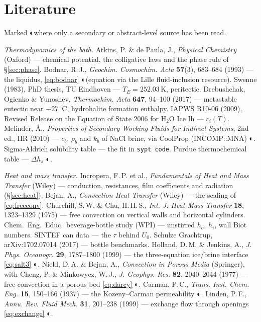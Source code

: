 \documentclass[11pt,a4paper]{article}
\newcommand{\dC}{\,^{\circ}\mathrm{C}}
\newcommand{\code}[1]{\texttt{#1}}
\newcommand{\secsrc}{{\symfont ◐}}
\begin{document}
\section{Literature}
\label{sec:lit}

Marked \secsrc where only a secondary or abstract-level source has been read.

\emph{Thermodynamics of the bath.} Atkins, P. \& de Paula, J., \emph{Physical Chemistry} (Oxford) — chemical
potential, the colligative laws and the phase rule of §\ref{sec:phase}. Bodnar, R.\,J., \emph{Geochim.
Cosmochim. Acta} \textbf{57}(3), 683–684 (1993) — the liquidus, \eqref{eq:bodnar} \secsrc (equation via the
Lille fluid-inclusion resource). Swenne (1983), PhD thesis, TU Eindhoven — $T_E = 252.03$\,K, peritectic.
Drebushchak, Ogienko \& Yunoshev, \emph{Thermochim. Acta} \textbf{647}, 94–100 (2017) — metastable eutectic
near $-27\dC$, hydrohalite formation enthalpy. IAPWS R10-06 (2009), Revised Release on the Equation of
State 2006 for H$_2$O Ice Ih — $c_i(T)$. Melinder, Å., \emph{Properties of Secondary Working Fluids for
Indirect Systems}, 2nd ed., IIR (2010) — $c_b$, $\rho_b$ and $k_b$ of NaCl brine, via CoolProp
(INCOMP::MNA) \secsrc. Sigma-Aldrich solubility table — the fit in \code{sypt code}. Purdue thermochemical
table — $\Delta h_s$ \secsrc.

\emph{Heat and mass transfer.} Incropera, F.\,P. et al., \emph{Fundamentals of Heat and Mass Transfer}
(Wiley) — conduction, resistances, film coefficients and radiation (§\ref{sec:heat}). Bejan, A.,
\emph{Convection Heat Transfer} (Wiley) — the scaling of \eqref{eq:freeconv}. Churchill, S.\,W. \& Chu,
H.\,H.\,S., \emph{Int. J. Heat Mass Transfer} \textbf{18}, 1323–1329 (1975) — free convection on vertical
walls and horizontal cylinders. Chem.\ Eng.\ Educ.\ beverage-bottle study (WPI) — unstirred $h_o$, $h_i$,
wall Biot numbers. SINTEF can data — the $\tau$ behind $U_0$. Schulze Grachtrup, arXiv:1702.07014 (2017)
— bottle benchmarks. Holland, D.\,M. \& Jenkins, A., \emph{J. Phys. Oceanogr.} \textbf{29}, 1787–1800
(1999) — the three-equation ice/brine interface \eqref{eq:salt3} \secsrc. Nield, D.\,A. \& Bejan, A.,
\emph{Convection in Porous Media} (Springer), with Cheng, P. \& Minkowycz, W.\,J., \emph{J. Geophys. Res.}
\textbf{82}, 2040–2044 (1977) — free convection in a porous bed \eqref{eq:darcy} \secsrc. Carman, P.\,C.,
\emph{Trans. Inst. Chem. Eng.} \textbf{15}, 150–166 (1937) — the Kozeny–Carman permeability \secsrc.
Linden, P.\,F., \emph{Annu. Rev. Fluid Mech.} \textbf{31}, 201–238 (1999) — exchange flow through openings
\eqref{eq:exchange} \secsrc.
\end{document}
